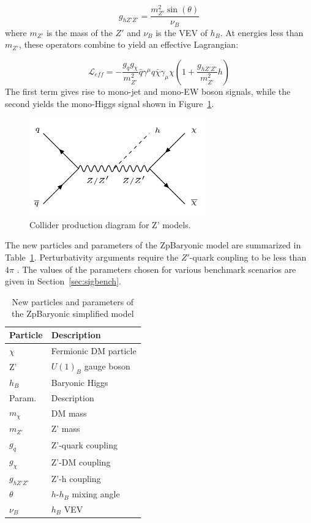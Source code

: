 \begin{equation}
g_{hZ'Z'} = \frac{m_{Z'}^2 \sin(\theta)}{\nu_B}
\end{equation}
where $m_{Z'}$ is the mass of the $Z'$ and $\nu_B$ is the VEV of $h_B$. At energies less than $m_{Z'}$, these operators combine to yield an effective Lagrangian:

\begin{equation}
\mathcal{L}_{eff} = -\frac{g_q g_\chi}{m_{Z'}^2} \bar{q} \gamma^\mu q \bar{\chi} \gamma_\mu \chi (1 + \frac{g_{hZ'Z'}}{m_{Z'}^2} h)
\end{equation}
The first term gives rise to mono-jet and mono-EW boson signals, while the second yields the mono-Higgs signal shown in Figure~\ref{fig:zpsig}.

\begin{figure}[tbh]
\centering
\includegraphics[width=3in]{figures/zpsig.png}
\caption{Collider production diagram for Z' models.}
\label{fig:zpsig}
\end{figure}

The new particles and parameters of the ZpBaryonic model are summarized in Table~\ref{tab:ZpBaryonic}. Perturbativity arguments require the $Z'$-quark coupling to be less than $4\pi$ \cite{Carpenter:2013xra}. The values of the parameters chosen for various benchmark scenarios are given in Section~\ref{sec:sigbench}.

\begin{table}[htbH]
\begin{center}
\begin{tabular}{ l | l}
\hline
Particle & Description \\
\hline
$\chi$ & Fermionic DM particle \\
Z' & $U(1)_B$ gauge boson \\
$h_B$ & Baryonic Higgs \\
\hline
Param. & Description \\
\hline
$m_\chi$ & DM mass \\
$m_{Z'}$ & Z' mass \\
$g_q$ & Z'-quark coupling \\
$g_\chi$ & Z'-DM coupling \\
$g_{hZ'Z'}$ & Z'-h coupling \\
$\theta$ & $h$-$h_B$ mixing angle \\
$\nu_B$ & $h_B$ VEV \\
\hline
\end{tabular}
\caption{New particles and parameters of the ZpBaryonic simplified model \cite{Carpenter:2013xra}}\label{tab:ZpBaryonic}
\end{center}
\end{table}

